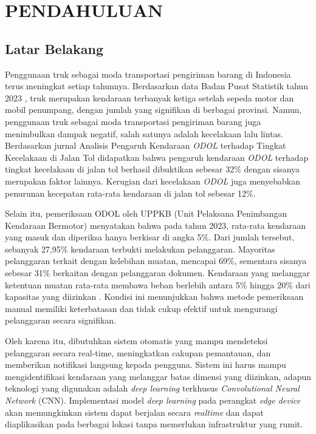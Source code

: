 \chapter{PENDAHULUAN}
\label{chap:pendahuluan}


\section{Latar Belakang}
\label{sec:latarbelakang}
Penggunaan truk sebagai moda transportasi pengiriman barang di Indonesia terus meningkat setiap tahunnya. Berdasarkan data Badan Pusat Statistik tahun 2023 \parencite*{bps2023}, truk merupakan kendaraan terbanyak ketiga setelah sepeda motor dan mobil penumpang, dengan jumlah yang signifikan di berbagai provinsi. Namun, penggunaan truk sebagai moda transportasi pengiriman barang juga menimbulkan dampak negatif, salah satunya adalah kecelakaan lalu lintas. Berdasarkan jurnal Analisis Pengaruh Kendaraan \emph{ODOL} terhadap Tingkat Kecelakaan di Jalan Tol \parencite*{odol2020} didapatkan bahwa pengaruh kendaraan \emph{ODOL} terhadap tingkat kecelakaan di jalan tol berhasil dibuktikan sebesar 32\% dengan sisanya merupakan faktor lainnya. Kerugian dari kecelakaan \emph{ODOL} juga menyebabkan penurunan kecepatan rata-rata kendaraan di jalan tol sebesar 12\%.

Selain itu, pemeriksaan ODOL oleh UPPKB (Unit Pelaksana Penimbangan Kendaraan Bermotor) menyatakan bahwa pada tahun 2023, rata-rata kendaraan yang masuk dan diperiksa hanya berkisar di angka 5\%. Dari jumlah tersebut, sebanyak 27,95\% kendaraan terbukti melakukan pelanggaran. Mayoritas pelanggaran terkait dengan kelebihan muatan, mencapai 69\%, sementara sisanya sebesar 31\% berkaitan dengan pelanggaran dokumen. Kendaraan yang melanggar ketentuan muatan rata-rata membawa beban berlebih antara 5\% hingga 20\% dari kapasitas yang diizinkan \parencite*{hubdat2024}. Kondisi ini menunjukkan bahwa metode pemeriksaan manual memiliki keterbatasan dan tidak cukup efektif untuk mengurangi pelanggaran secara signifikan.

Oleh karena itu, dibutuhkan sistem otomatis yang mampu mendeteksi pelanggaran secara real-time, meningkatkan cakupan pemantauan, dan memberikan notifikasi langsung kepada pengguna. Sistem ini harus mampu mengidentifikasi kendaraan yang melanggar batas dimensi yang diizinkan, adapun teknologi yang digunakan adalah \emph{deep learning} terkhusus \emph{Convolutional Neural Network} (CNN). Implementasi model \emph{deep learning} pada perangkat \emph{edge device} akan memungkinkan sistem dapat berjalan secara \emph{realtime} dan dapat diaplikasikan pada berbagai lokasi tanpa memerlukan infrastruktur yang rumit.


